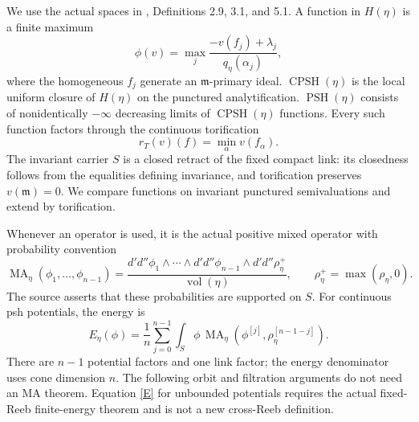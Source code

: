 \documentclass[11pt]{article}
\newcommand{\CPSH}{\operatorname{CPSH}}
\newcommand{\PSH}{\operatorname{PSH}}
\newcommand{\MA}{\operatorname{MA}}
\newcommand{\vol}{\operatorname{vol}}
\begin{document}
We use the actual spaces in \cite{YW24}, Definitions 2.9, 3.1, and 5.1.
A function in $H(\eta)$ is a finite maximum
\begin{equation}\label{FS}
 \phi(v)=\max_j\frac{-v(f_j)+\lambda_j}{q_\eta(\alpha_j)},
\end{equation}
where the homogeneous $f_j$ generate an $\mathfrak m$-primary ideal.
$\CPSH(\eta)$ is the local uniform closure of $H(\eta)$ on the punctured analytification.
$\PSH(\eta)$ consists of nonidentically $-\infty$ decreasing limits of $\CPSH(\eta)$ functions.
Every such function factors through the continuous torification
\[
 r_T(v)(f)=\min_\alpha v(f_\alpha).
\]
The invariant carrier $S$ is a closed retract of the fixed compact link: its closedness follows from the equalities defining invariance, and torification preserves $v(\mathfrak m)=0$.
We compare functions on invariant punctured semivaluations and extend by torification.

Whenever an operator is used, it is the actual positive mixed operator with probability convention
\begin{equation}\label{MA}
 \MA_\eta(\phi_1,\ldots,\phi_{n-1})=
 \frac{d'd''\phi_1\wedge\cdots\wedge d'd''\phi_{n-1}\wedge d'd''\rho_\eta^+}{\vol(\eta)},
 \qquad \rho_\eta^+=\max(\rho_\eta,0).
\end{equation}
The source asserts that these probabilities are supported on $S$.
For continuous psh potentials, the energy is
\begin{equation}\label{E}
 E_\eta(\phi)=\frac1n\sum_{j=0}^{n-1}
 \int_S\phi\,\MA_\eta(\phi^{[j]},\rho_\eta^{[n-1-j]}).
\end{equation}
There are $n-1$ potential factors and one link factor; the energy denominator uses cone dimension $n$.
The following orbit and filtration arguments do not need an MA theorem.
Equation \eqref{E} for unbounded potentials requires the actual fixed-Reeb finite-energy theorem and is not a new cross-Reeb definition.
\end{document}
